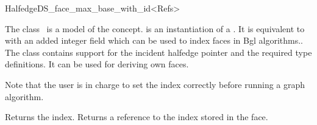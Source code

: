 

\begin{ccRefClass}{HalfedgeDS_face_max_base_with_id<Refs>}
  
\ccDefinition

The class \ccRefName\ is a model of the 
concept.  is an instantiation of a .  It is
equivalent to 
with an added integer field which can be used to index faces
in {\sc Bgl} algorithms.. 
The class contains support for the incident halfedge pointer
and the required type definitions.
It can be used for deriving own faces.

Note that the user is in charge to set the index correctly before
running a graph algorithm.



\ccIsModel


\ccCreation
{}


{Returns the index.}
\ccGlue
{}
{Returns a reference to the index stored in the face.}

\ccSeeAlso

\\
\\
\\
\\
\\
\\
\\
\\
\\
\\

\end{ccRefClass}
